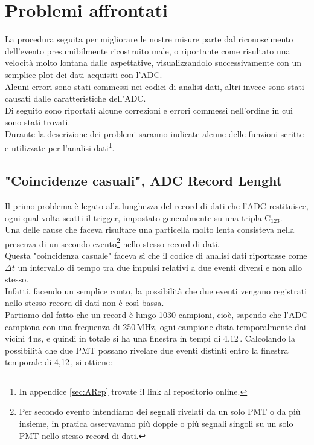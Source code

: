 \documentclass[a4paper,twocolumn]{article}
\begin{document}
\section{Problemi affrontati}
\label{sec:AProblemiADC}
La procedura seguita per migliorare le nostre misure parte dal riconoscimento dell'evento presumibilmente ricostruito male, o riportante come risultato una velocità molto lontana dalle aspettative, visualizzandolo successivamente con un semplice plot dei dati acquisiti con l'ADC.\\
Alcuni errori sono stati commessi nei codici di analisi dati, altri invece sono stati causati dalle caratteristiche dell'ADC.\\
Di seguito sono riportati alcune correzioni e errori commessi nell'ordine in cui sono stati trovati.\\
Durante la descrizione dei problemi saranno indicate alcune delle funzioni scritte e utilizzate per l'analisi dati\footnote{In appendice \ref{sec:ARep} trovate il link al repositorio online.}.

\subsection{"Coincidenze casuali", ADC Record Lenght}
\label{sec:ARecLenght}
Il primo problema è legato alla lunghezza del record di dati che l'ADC restituisce, ogni qual volta scatti il trigger, impostato generalmente su una tripla C$_{123}$.\\
Una delle cause che faceva risultare una particella molto lenta consisteva nella presenza di un secondo evento\footnote{Per secondo evento intendiamo dei segnali rivelati da un solo PMT o da più insieme, in pratica osservavamo più doppie o più segnali singoli su un solo PMT nello stesso record di dati.} nello stesso record di dati.\\
Questa "coincidenza casuale" faceva sì che il codice di analisi dati riportasse come $\Delta t$ un intervallo di tempo tra due impulsi relativi a due eventi diversi e non allo stesso.\\
Infatti, facendo un semplice conto, la possibilità che due eventi vengano registrati nello stesso record di dati non è così bassa.\\
Partiamo dal fatto che un record è lungo 1030 campioni, cioè, sapendo che l'ADC campiona con una frequenza di 250\,MHz, ogni campione dista temporalmente dai vicini 4\,ns, e quindi in totale si ha una finestra in tempi di 4,12\,\micro\second. Calcolando la possibilità che due PMT possano rivelare due eventi distinti entro la finestra temporale di 4,12\,\micro\second, si ottiene:
\end{document}
